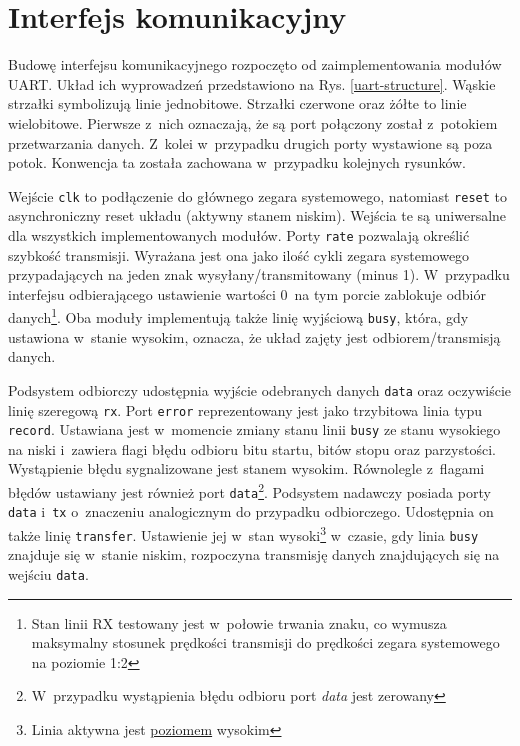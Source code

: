 \section{Interfejs komunikacyjny}

Budowę interfejsu komunikacyjnego rozpoczęto od zaimplementowania modułów UART. Układ ich wyprowadzeń przedstawiono na Rys. \ref{uart-structure}. Wąskie strzałki symbolizują linie jednobitowe. Strzałki czerwone oraz żółte to linie wielobitowe. Pierwsze z~nich oznaczają, że są port połączony został z~potokiem przetwarzania danych. Z~kolei w~przypadku drugich porty wystawione są poza potok. Konwencja ta została zachowana w~przypadku kolejnych rysunków.

Wejście \verb|clk| to podłączenie do głównego zegara systemowego, natomiast \verb|reset| to asynchroniczny reset układu (aktywny stanem niskim). Wejścia te są uniwersalne dla wszystkich implementowanych modułów. Porty \verb|rate| pozwalają określić szybkość transmisji. Wyrażana jest ona jako ilość cykli zegara systemowego przypadających na jeden znak wysyłany/transmitowany (minus 1). W~przypadku interfejsu odbierającego ustawienie wartości 0~na tym porcie zablokuje odbiór danych\footnote{Stan linii RX testowany jest w~połowie trwania znaku, co wymusza maksymalny stosunek prędkości transmisji do prędkości zegara systemowego na poziomie 1:2}. Oba moduły implementują także linię wyjściową \verb|busy|, która, gdy ustawiona w~stanie wysokim, oznacza, że układ zajęty jest odbiorem/transmisją danych. 

Podsystem odbiorczy udostępnia wyjście odebranych danych \verb|data| oraz oczywiście linię szeregową \verb|rx|. Port \verb|error| reprezentowany jest jako trzybitowa linia typu \verb|record|. Ustawiana jest w~momencie zmiany stanu linii \verb|busy| ze stanu wysokiego na niski i~zawiera flagi błędu odbioru bitu startu, bitów stopu oraz parzystości. Wystąpienie błędu sygnalizowane jest stanem wysokim. Równolegle z~flagami błędów ustawiany jest również port \verb|data|\footnote{W~przypadku wystąpienia błędu odbioru port \textit{data} jest zerowany}. Podsystem nadawczy posiada porty \verb|data| i~\verb|tx| o~znaczeniu analogicznym do przypadku odbiorczego. Udostępnia on także linię \verb|transfer|. Ustawienie jej w~stan wysoki\footnote{Linia aktywna jest \underline{poziomem} wysokim} w~czasie, gdy linia \verb|busy| znajduje się w~stanie niskim, rozpoczyna transmisję danych znajdujących się na wejściu \verb|data|.

